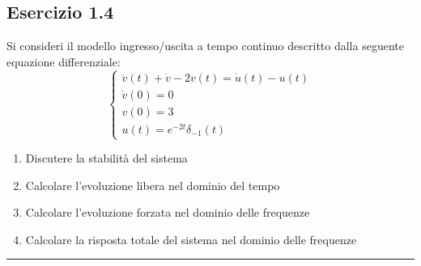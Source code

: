 \documentclass[12pt,a4paper]{article}
\begin{document}
	\subsection*{Esercizio 1.4} Si consideri il modello ingresso/uscita a tempo continuo descritto dalla seguente equazione differenziale:
	\[
	\begin{cases}
		\ddot{v}(t) + \dot{v} -2v(t) = \dot{u}(t) - u(t)\\
		\dot{v}(0) = 0\\
		v(0) = 3\\
		u(t) = e^{-2t}\delta_{-1}(t)
	\end{cases}
	\]
	\begin{enumerate}
		\item Discutere la stabilità del sistema
		\item Calcolare l'evoluzione libera nel dominio del tempo
		\item Calcolare l'evoluzione forzata nel dominio delle frequenze
		\item Calcolare la risposta totale del sistema nel dominio delle frequenze
	\end{enumerate}
	\par\noindent\rule{\textwidth}{0.4pt}
\end{document}
